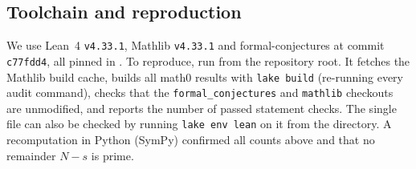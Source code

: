 \documentclass[11pt]{amsart}
\theoremstyle{plain}
\theoremstyle{definition}
\begin{document}
\subsection*{Toolchain and reproduction}
We use Lean~4 \cite{Lean4} \texttt{v4.33.1}, Mathlib \cite{Mathlib} \texttt{v4.33.1} and formal-conjectures \cite{FC} at commit \texttt{c77fdd4}, all pinned in .
To reproduce, run  from the repository root. It fetches the Mathlib build cache, builds all math0 results with \texttt{lake build} (re-running every audit command), checks that the \texttt{formal\_conjectures} and \texttt{mathlib} checkouts are unmodified, and reports the number of passed statement checks. The single file can also be checked by running \texttt{lake env lean} on it from the  directory.
A recomputation in Python (SymPy) confirmed all counts above and that no remainder $N-s$ is prime.
\end{document}
